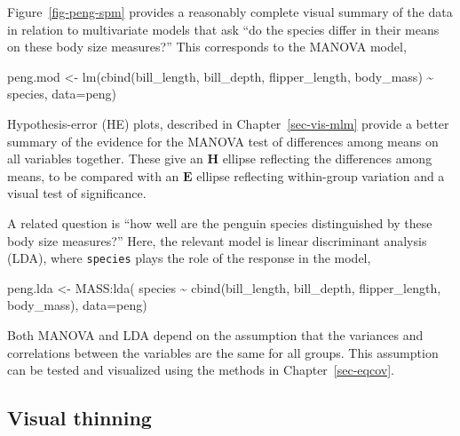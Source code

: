 \documentclass[
  letterpaper,
  10pt,
  krantz2]{krantz}
\makeatletter
\newenvironment{Shaded}{\begin{snugshade}}{\end{snugshade}}
\newcommand{\AttributeTok}[1]{\textcolor[rgb]{0.40,0.45,0.13}{#1}}
\newcommand{\FunctionTok}[1]{\textcolor[rgb]{0.28,0.35,0.67}{#1}}
\newcommand{\NormalTok}[1]{\textcolor[rgb]{0.00,0.23,0.31}{#1}}
\newcommand{\OtherTok}[1]{\textcolor[rgb]{0.00,0.23,0.31}{#1}}
\newcommand{\SpecialCharTok}[1]{\textcolor[rgb]{0.37,0.37,0.37}{#1}}
\newenvironment{kframe}{%
  \medskip{}
  \setlength{\fboxsep}{.8em}
  \def\at@end@of@kframe{}%
  \ifinner\ifhmode%
  \def\at@end@of@kframe{\end{minipage}}%
  \begin{minipage}{\columnwidth}%
  \fi\fi%
  \def\FrameCommand##1{\hskip\@totalleftmargin \hskip-\fboxsep
  \colorbox{shadecolor}{##1}\hskip-\fboxsep
      \hskip-\linewidth \hskip-\@totalleftmargin \hskip\columnwidth}%
  \MakeFramed {\advance\hsize-\width
    \@totalleftmargin\z@ \linewidth\hsize
    \@setminipage}}%
{\par\unskip\endMakeFramed%
  \at@end@of@kframe}
\renewenvironment{Shaded}{\begin{kframe}}{\end{kframe}}
\makeatother
\begin{document}
{\begin{tcolorbox}
Figure~\ref{fig-peng-spm} provides a reasonably complete visual summary
of the data in relation to multivariate models that ask ``do the species
differ in their means on these body size measures?'' This corresponds to
the MANOVA model,

\begin{Shaded}
\begin{Highlighting}[]
\NormalTok{peng.mod }\OtherTok{\textless{}{-}} \FunctionTok{lm}\NormalTok{(}\FunctionTok{cbind}\NormalTok{(bill\_length, bill\_depth, flipper\_length, body\_mass) }\SpecialCharTok{\textasciitilde{}}\NormalTok{ species, }
               \AttributeTok{data=}\NormalTok{peng)}
\end{Highlighting}
\end{Shaded}

Hypothesis-error (HE) plots, described in Chapter~\ref{sec-vis-mlm}
provide a better summary of the evidence for the MANOVA test of
differences among means on all variables together. These give an
\(\mathbf{H}\) ellipse reflecting the differences among means, to be
compared with an \(\mathbf{E}\) ellipse reflecting within-group
variation and a visual test of significance.

A related question is ``how well are the penguin species distinguished
by these body size measures?'' Here, the relevant model is linear
discriminant analysis (LDA), where \texttt{species} plays the role of
the response in the model,

\begin{Shaded}
\begin{Highlighting}[]
\NormalTok{peng.lda }\OtherTok{\textless{}{-}}\NormalTok{ MASS}\SpecialCharTok{:}\FunctionTok{lda}\NormalTok{( species }\SpecialCharTok{\textasciitilde{}} \FunctionTok{cbind}\NormalTok{(bill\_length, bill\_depth, flipper\_length, body\_mass), }
               \AttributeTok{data=}\NormalTok{peng)}
\end{Highlighting}
\end{Shaded}

Both MANOVA and LDA depend on the assumption that the variances and
correlations between the variables are the same for all groups. This
assumption can be tested and visualized using the methods in
Chapter~\ref{sec-eqcov}.

\end{tcolorbox}

\subsection{Visual thinning}\label{visual-thinning}

}
\end{document}

